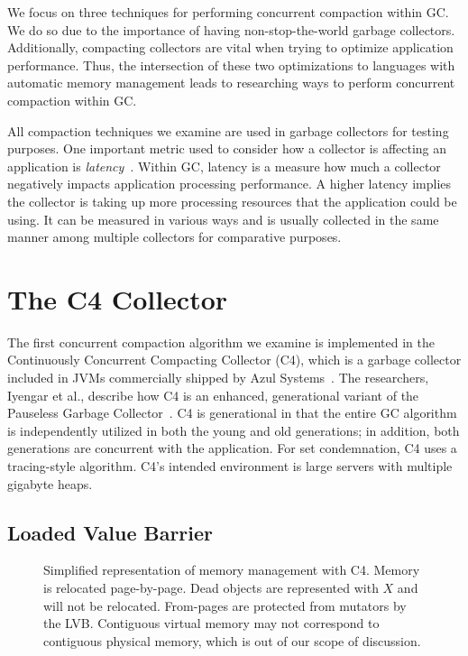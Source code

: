 \documentclass{sig-alternate}
\begin{document}
We focus on three techniques for performing
concurrent compaction within GC. We do so due to the importance 
of having non-stop-the-world garbage collectors. Additionally, compacting
collectors are vital when trying to optimize application performance. Thus,
the intersection of these two optimizations to languages with automatic memory management leads
to researching ways to perform concurrent compaction within GC.

All compaction techniques we examine are used in garbage
collectors for testing purposes. One important metric used to consider
how a collector is affecting an application is \emph{latency}~\cite{Lindblom:2011}.
Within GC, latency is a measure how much a collector negatively impacts
application processing performance. A higher latency implies the collector
is taking up more processing resources that the application could be using. It 
can be measured in various ways and is usually collected in the same manner
among multiple collectors for comparative purposes.


\section{The C4 Collector}
\label{sec:c4}

The first concurrent compaction algorithm we examine is implemented in the 
Continuously Concurrent Compacting Collector (C4), which is a garbage collector 
included in JVMs commercially shipped by Azul Systems~\cite{Tene:C4}. The 
researchers, Iyengar et al., describe how C4 is an enhanced, generational variant
of the Pauseless Garbage Collector~\cite{Click:Pauseless}. C4 is generational in 
that the entire GC algorithm is independently utilized in both the young and old generations;
in addition, both generations are concurrent with the application. 
For set condemnation, C4 uses a tracing-style algorithm.
C4's intended environment is large servers with multiple gigabyte heaps.


\subsection{Loaded Value Barrier}
\label{sec:c4LVB}

\begin{figure}
\centering
{}
\caption{Simplified representation of memory management with C4. Memory is relocated
page-by-page. Dead objects are represented with $X$ and will not be relocated.
From-pages are protected from mutators by the LVB. Contiguous virtual memory
may not correspond to contiguous physical memory, which is out of our scope of discussion.}
\label{fig:c4Memory}
\end{figure}
\end{document}
